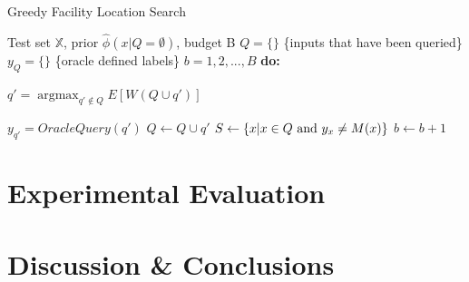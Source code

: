\documentclass[letterpaper]{article} %
\DeclareMathOperator*{\argmax}{argmax}
\begin{document}
\begin{algorithm}
	\caption{Greedy Facility Location Search}
	\label{alg:Greedy}
	\begin{algorithmic}
		 Test set $\mathbb{X}$, prior $\hat{\phi}\left(x|Q=\emptyset\right)$, budget B
		\STATE $Q=\{\}$ \{inputs that have been queried\}
		\STATE $y_Q = \{\}$ \{oracle defined labels\}
		 $b = 1, 2, ..., B$ {\bfseries do:}

		\STATE $q' = \argmax_{q' \not\in Q} E \left[W\left(Q \cup q'\right) \right]$
		
		\STATE $y_{q'} = OracleQuery(q')$
		\STATE $Q \leftarrow Q \cup q'$
		\STATE $S \leftarrow \left\{x | x \in Q \space \text{ and } y_x \neq M(x) \right\}$
		\STATE $b \leftarrow b + 1$
			

	\end{algorithmic}
\end{algorithm}



\section{Experimental Evaluation}



\section{Discussion \& Conclusions}



\newpage



\end{document}
